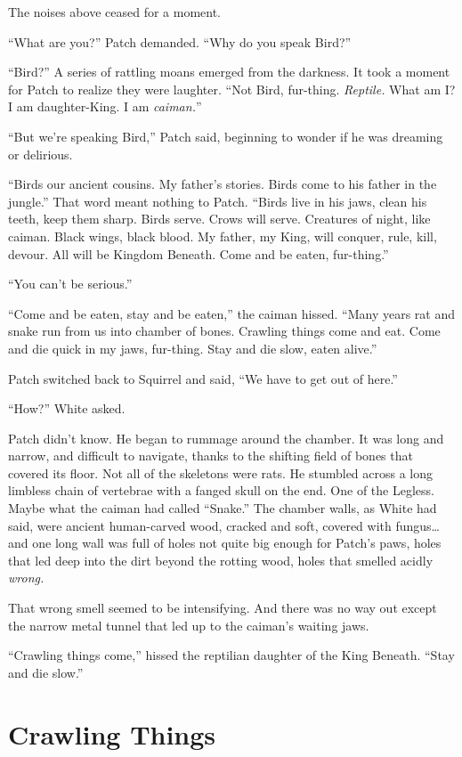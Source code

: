\documentclass[12pt]{memoir}
\begin{document}
The noises above ceased for a moment.

“What are you?” Patch demanded. “Why do you speak Bird?”

“Bird?” A series of rattling moans emerged from the darkness. It took
a moment for Patch to realize they were laughter. “Not Bird,
fur-thing. \textit{Reptile.} What am I? I am daughter-King. I am
\textit{caiman.}”

“But we’re speaking Bird,” Patch said, beginning to wonder if he was
dreaming or delirious.

“Birds our ancient cousins. My father’s stories. Birds come to his
father in the jungle.” That word meant nothing to Patch. “Birds live
in his jaws, clean his teeth, keep them sharp. Birds serve. Crows will
serve. Creatures of night, like caiman. Black wings, black blood. My
father, my King, will conquer, rule, kill, devour. All will be Kingdom
Beneath. Come and be eaten, fur-thing.”

“You can’t be serious.”

“Come and be eaten, stay and be eaten,” the caiman hissed. “Many years
rat and snake run from us into chamber of bones. Crawling things come
and eat. Come and die quick in my jaws, fur-thing. Stay and die slow,
eaten alive.”

Patch switched back to Squirrel and said, “We have to get out of
here.”

“How?” White asked.

Patch didn’t know. He began to rummage around the chamber. It was long
and narrow, and difficult to navigate, thanks to the shifting field of
bones that covered its floor. Not all of the skeletons were rats. He
stumbled across a long limbless chain of vertebrae with a fanged skull
on the end. One of the Legless. Maybe what the caiman had called
“Snake.” The chamber walls, as White had said, were ancient
human-carved wood, cracked and soft, covered with fungus… and one long
wall was full of holes not quite big enough for Patch’s paws, holes
that led deep into the dirt beyond the rotting wood, holes that
smelled acidly \textit{wrong.}

That wrong smell seemed to be intensifying. And there was no way out
except the narrow metal tunnel that led up to the caiman’s waiting
jaws.

“Crawling things come,” hissed the reptilian daughter of the King
Beneath. “Stay and die slow.”


\section{Crawling Things}
\end{document}
